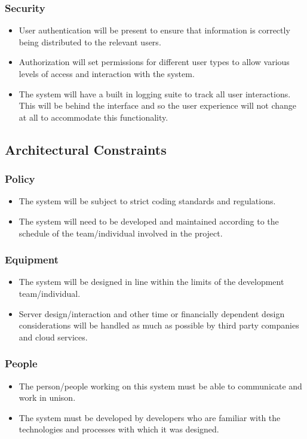 \documentclass[11pt]{article}
\begin{document}
    \subsubsection{Security}
    \begin{itemize}
        \item User authentication will be present to ensure that information is correctly being distributed to the relevant users.
        \item Authorization will set permissions for different user types to allow various levels of access and interaction with the system.
        \item The system will have a built in logging suite to track all user interactions. This will be behind the interface and so the user experience will not change at all to accommodate this functionality.
    \end{itemize}
\subsection{Architectural Constraints}
    \subsubsection{Policy}
    \begin{itemize}
        \item The system will be subject to strict coding standards and regulations.
        \item The system will need to be developed and maintained according to the schedule of the team/individual involved in the project.
    \end{itemize}
    \subsubsection{Equipment}
    \begin{itemize}
        \item The system will be designed in line within the limits of the development team/individual.
        \item Server design/interaction and other time or financially dependent design considerations will be handled as much as possible by third party companies and cloud services.
    \end{itemize}
    \subsubsection{People}
    \begin{itemize}
        \item The person/people working on this system must be able to communicate and work in unison.
        \item The system must be developed by developers who are familiar with the technologies and processes with which it was designed.
    \end{itemize}
\end{document}
